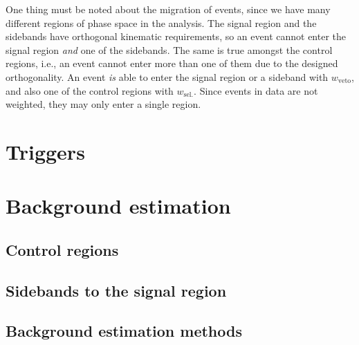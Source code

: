 One thing must be noted about the migration of events, since we have many different regions of phase space in the analysis. The signal region and the sidebands have orthogonal kinematic requirements, so an event cannot enter the signal region \emph{and} one of the sidebands. The same is true amongst the control regions, i.e., an event cannot enter more than one of them due to the designed orthogonality. An event \emph{is} able to enter the signal region or a sideband with $w_{\mathrm{veto}}$, and also one of the control regions with $w_{\mathrm{sel.}}$. Since events in data are not weighted, they may only enter a single region.




\section{Triggers}
\label{sec:htoinv_triggers}

\section{Background estimation}
\label{sec:htoinv_background_est}

\subsection{Control regions}
\label{subsec:htoinv_crs}

\subsection{Sidebands to the signal region}
\label{subsec:htoinv_sidebands}

\subsection{Background estimation methods}
\label{subsec:htoinv_background_methods}
